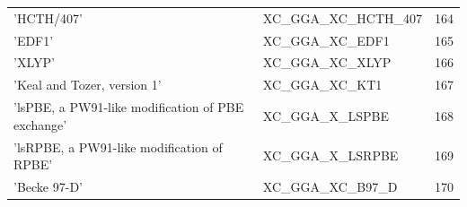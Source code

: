 \documentclass[final,12pt]{article}
\begin{document}
{{{{{{\begin{table}[!h]
\begin{center}
\begin{tabular}{llr}
  'HCTH/407' & XC\_GGA\_XC\_HCTH\_407  &164\\
  'EDF1' & XC\_GGA\_XC\_EDF1  &165\\
  'XLYP' & XC\_GGA\_XC\_XLYP  &166\\
  'Keal and Tozer, version 1' & XC\_GGA\_XC\_KT1  &167\\
  'lsPBE, a PW91-like modification of PBE exchange' & XC\_GGA\_X\_LSPBE  &168\\
  'lsRPBE, a PW91-like modification of RPBE' & XC\_GGA\_X\_LSRPBE  &169\\
  'Becke 97-D' & XC\_GGA\_XC\_B97\_D  &170\\
\hline
\hline
\end{tabular}
\end{center}
\end{table}

}}}}}}
\end{document}
